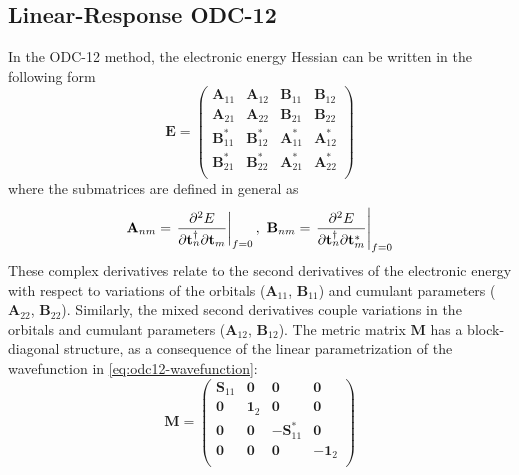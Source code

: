 \subsection{Linear-Response ODC-12}
\label{sec:lr_odc12}
In the ODC-12 method, the electronic energy Hessian can be written in the following
form
\begin{equation}
    \label{eq:lr-odc12-hessian-blocks}
    \mathbf{E}
    =
    \begin{pmatrix}
        \mathbf{A}_{11} & \mathbf{A}_{12} & \mathbf{B}_{11} & \mathbf{B}_{12} \\
        \mathbf{A}_{21} & \mathbf{A}_{22} & \mathbf{B}_{21} & \mathbf{B}_{22} \\
        \mathbf{B}_{11}^* & \mathbf{B}_{12}^* & \mathbf{A}_{11}^* & \mathbf{A}_{12}^* \\
        \mathbf{B}_{21}^* & \mathbf{B}_{22}^* & \mathbf{A}_{21}^* & \mathbf{A}_{22}^* \\
    \end{pmatrix}
\end{equation}
where the submatrices are defined in general as
\begin{equation}
    \label{eq:hessian-blocks}
    \mathbf{A}_{nm}
    =
    \left.
    \frac{\partial^2 E}{%
        \partial \mathbf{t}_n^\dagger
        \partial \mathbf{t}_m
    }
    \right|_{f=0}
    ,\ 
    \mathbf{B}_{nm}
    =
    \left.
    \frac{\partial^2 E}{%
        \partial \mathbf{t}_n^\dagger
        \partial \mathbf{t}_m^*
    }
    \right|_{f=0}
\end{equation}
These complex derivatives relate to the second derivatives of the
electronic energy with respect to variations of the orbitals ($\mathbf{A}_{11}$, $\mathbf{B}_{11}$) and
cumulant parameters ($\mathbf{A}_{22}$, $\mathbf{B}_{22}$).
Similarly, the mixed second derivatives couple variations in the orbitals
and cumulant parameters ($\mathbf{A}_{12}$, $\mathbf{B}_{12}$). 
The metric matrix \(\mathbf{M}\) has a block-diagonal structure, as a
consequence of the linear parametrization of the wavefunction in
\cref{eq:odc12-wavefunction}:
\begin{equation}
    \label{eq:lr-odc12-metric-blocks}
    \mathbf{M}
    =
    \begin{pmatrix}
        \mathbf{S}_{11} & \mathbf{0} & \mathbf{0} & \mathbf{0} \\
        \mathbf{0} & \mathbf{1}_2 & \mathbf{0} & \mathbf{0} \\
        \mathbf{0} & \mathbf{0} & -\mathbf{S}_{11}^* & \mathbf{0} \\
        \mathbf{0} & \mathbf{0} & \mathbf{0} & -\mathbf{1}_2 \\
    \end{pmatrix}
\end{equation}
